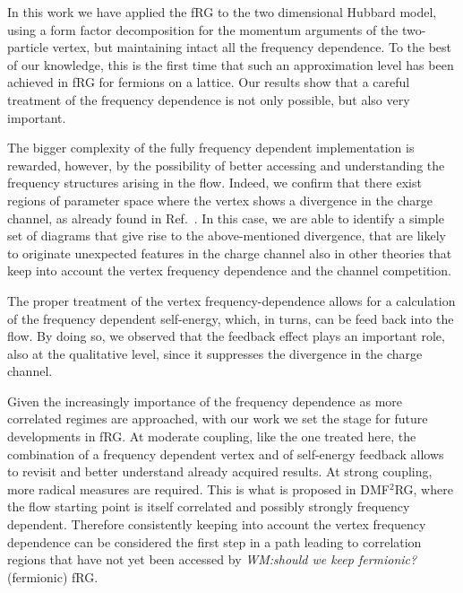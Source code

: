In this work we have applied the fRG to the two dimensional Hubbard model, using a form factor decomposition for the momentum arguments of the two-particle vertex, but maintaining intact all the frequency dependence. 
To the best of our knowledge, this is the first time that such an approximation level has been achieved in fRG for fermions on a lattice.
Our results show that a careful treatment of the frequency dependence is not only possible, but also very important.

The bigger complexity of the fully frequency dependent implementation is rewarded, however, by the possibility of better accessing and understanding the frequency structures arising in the flow.
Indeed, we confirm that there exist regions of parameter space where the vertex shows a divergence in the charge channel, as already found in Ref.~.
 In this case, we are able to identify a simple set of diagrams that give rise to the above-mentioned divergence, that are likely to originate unexpected features in the charge channel also in other theories that keep into account the vertex frequency dependence and the channel competition.\cite{Stepanov2016}
 
The proper treatment of the vertex frequency-dependence allows for a  calculation of the frequency dependent self-energy, which, in turns, can be feed back into the flow.
 By doing so, we observed that the feedback effect plays an important role, also at the qualitative level, since it suppresses the divergence in the charge channel. 

Given the increasingly importance of the frequency dependence as more correlated regimes are approached, with our work we set the stage for future developments in fRG.
At moderate coupling, like the one treated here, the combination of a frequency dependent vertex and of self-energy feedback allows to revisit and better understand already acquired results.
At strong coupling, more radical measures are required. 
This is what is proposed in DMF$^2$RG,\cite{Taranto2014} where the flow starting point is itself correlated and possibly strongly frequency dependent. 
Therefore consistently keeping into account the vertex frequency dependence can be considered the first step in a path leading to correlation regions that have not yet been accessed by \emph{WM:should we keep fermionic?} (fermionic) fRG. 
 